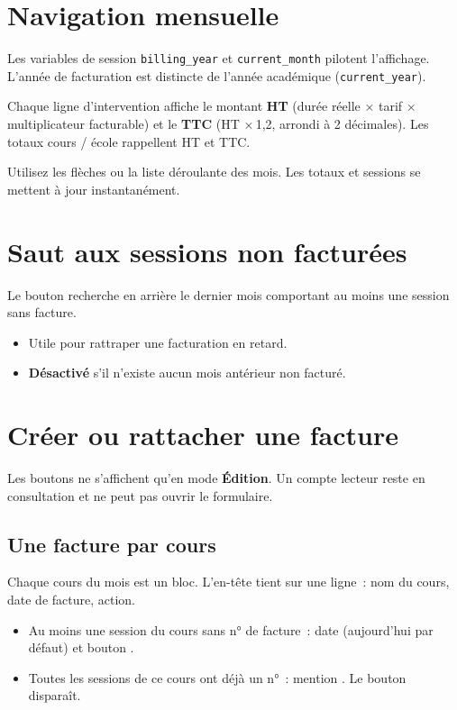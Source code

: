 \section{Navigation mensuelle}

Les variables de session \texttt{billing\_year} et \texttt{current\_month} pilotent l'affichage. L'année de facturation est distincte de l'année académique (\texttt{current\_year}).

Chaque ligne d'intervention affiche le montant \textbf{HT} (durée réelle × tarif × multiplicateur facturable) et le \textbf{TTC} (HT ×\,1{,}2, arrondi à 2 décimales). Les totaux cours / école rappellent HT et TTC.

\begin{workflowstep}
  Utilisez les flèches ou la liste déroulante des mois. Les totaux et sessions se mettent à jour instantanément.
\end{workflowstep}

\section{Saut aux sessions non facturées}

Le bouton  recherche en arrière le dernier mois comportant au moins une session sans facture.

\begin{itemize}[leftmargin=*]
  \item Utile pour rattraper une facturation en retard.
  \item \textbf{Désactivé} s'il n'existe aucun mois antérieur non facturé.
\end{itemize}

\section{Créer ou rattacher une facture}

Les boutons ne s'affichent qu'en mode \textbf{Édition}. Un compte lecteur reste en consultation et ne peut pas ouvrir le formulaire.

\subsection{Une facture par cours}

Chaque cours du mois est un bloc. L'en-tête tient sur une ligne~: nom du cours, date de facture, action.

\begin{itemize}[leftmargin=*]
  \item Au moins une session du cours sans n° de facture~: date (aujourd'hui par défaut) et bouton .
  \item Toutes les sessions de ce cours ont déjà un n°~: mention . Le bouton disparaît.
\end{itemize}

